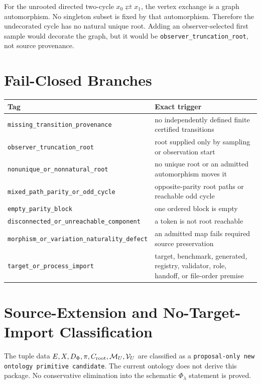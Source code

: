 \documentclass[11pt]{article}
\begin{document}
For the unrooted directed two-cycle \(x_0\rightleftarrows x_1\), the vertex
exchange is a graph automorphism. No singleton subset is fixed by that
automorphism. Therefore the undecorated cycle has no natural unique root.
Adding an observer-selected first sample would decorate the graph, but it
would be \texttt{observer\_truncation\_root}, not source provenance.

\section{Fail-Closed Branches}

\begin{center}
\begin{tabular}{ll}
\toprule
Tag & Exact trigger \\
\midrule
\texttt{missing\_transition\_provenance} & no independently defined finite certified transitions \\
\texttt{observer\_truncation\_root} & root supplied only by sampling or observation start \\
\texttt{nonunique\_or\_nonnatural\_root} & no unique root or an admitted automorphism moves it \\
\texttt{mixed\_path\_parity\_or\_odd\_cycle} & opposite-parity root paths or reachable odd cycle \\
\texttt{empty\_parity\_block} & one ordered block is empty \\
\texttt{disconnected\_or\_unreachable\_component} & a token is not root reachable \\
\texttt{morphism\_or\_variation\_naturality\_defect} & an admitted map fails required source preservation \\
\texttt{target\_or\_process\_import} & target, benchmark, generated, registry, validator, role, handoff, or file-order premise \\
\bottomrule
\end{tabular}
\end{center}

\section{Source-Extension and No-Target-Import Classification}

The tuple data \(E,X,D_\Phi,\pi,C_{\rm root},\mathcal M_U,\mathcal V_U\)
are classified as a \texttt{proposal-only new ontology primitive candidate}.
The current ontology does not derive this package. No conservative elimination
into the schematic \(\Phi_\lambda\) statement is proved.
\end{document}
